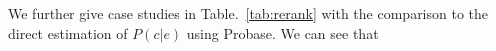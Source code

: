 We further give case studies in Table.~\ref{tab:rerank} with the comparison to the direct estimation of $P(c|e)$ using Probase. We can see that
%
